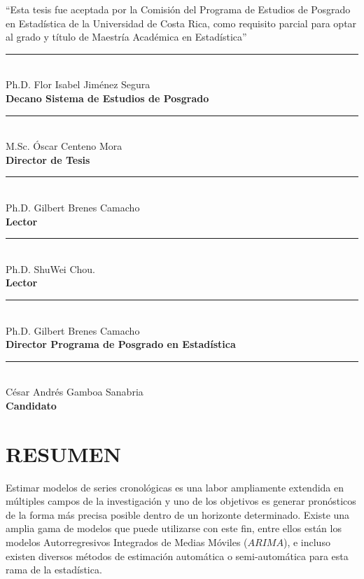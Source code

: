 \documentclass[
]{article}
\begin{document}
\begin{center}

``Esta tesis fue aceptada por la Comisión del Programa de Estudios de Posgrado en Estadística de la Universidad de Costa Rica, como requisito parcial para optar al grado y título de Maestría Académica en Estadística''

\text{}

\noindent\rule{7cm}{0.4pt}\\
Ph.D. Flor Isabel Jiménez Segura\\
\textbf{Decano Sistema de Estudios de Posgrado}

\text{}

\noindent\rule{7cm}{0.4pt}\\
M.Sc. Óscar Centeno Mora\\
\textbf{Director de Tesis}

\text{}

\noindent\rule{7cm}{0.4pt}\\
Ph.D. Gilbert Brenes Camacho\\
\textbf{Lector}

\text{}

\noindent\rule{7cm}{0.4pt}\\
Ph.D. ShuWei Chou.\\
\textbf{Lector}

\text{}

\noindent\rule{7cm}{0.4pt}\\
Ph.D. Gilbert Brenes Camacho\\
\textbf{Director Programa de Posgrado en Estadística}

\text{}

\noindent\rule{7cm}{0.4pt}\\
César Andrés Gamboa Sanabria\\
\textbf{Candidato}

\end{center}

\cleardoublepage

\tableofcontents

\cleardoublepage

\section*{RESUMEN}

Estimar modelos de series cronológicas es una labor ampliamente
extendida en múltiples campos de la investigación y uno de los objetivos
es generar pronósticos de la forma más precisa posible dentro de un
horizonte determinado. Existe una amplia gama de modelos que puede
utilizarse con este fin, entre ellos están los modelos Autorregresivos
Integrados de Medias Móviles (\(ARIMA\)), e incluso existen diversos
métodos de estimación automática o semi-automática para esta rama de la
estadística.
\end{document}
